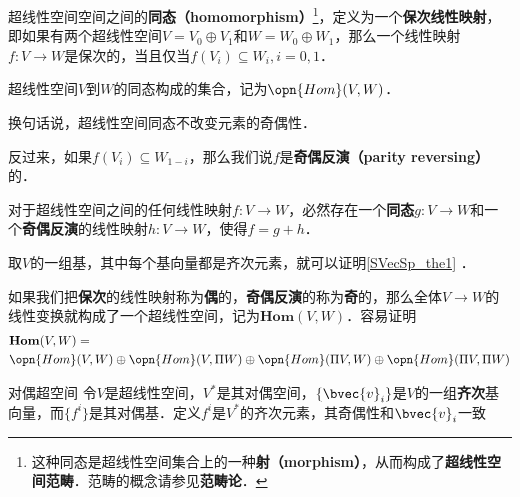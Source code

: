 超线性空间空间之间的\textbf{同态（homomorphism）}\footnote{这种同态是超线性空间集合上的一种\textbf{射（morphism）}，从而构成了\textbf{超线性空间范畴}．范畴的概念请参见\textbf{范畴论}．}，定义为一个\textbf{保次线性映射}，即如果有两个超线性空间$V=V_0\oplus V_1$和$W=W_0\oplus W_1$，那么一个线性映射$f:V\to W$是保次的，当且仅当$f(V_i)\subseteq W_i, i=0, 1$．

\begin{definition}{}
超线性空间$V$到$W$的同态构成的集合，记为$\opn{Hom}(V, W)$．
\end{definition}

换句话说，超线性空间同态不改变元素的奇偶性．

反过来，如果$f(V_i)\subseteq W_{1-i}$，那么我们说$f$是\textbf{奇偶反演（parity reversing）}的．

\begin{theorem}{}\label{SVecSp_the1}
对于超线性空间之间的任何线性映射$f:V\to W$，必然存在一个\textbf{同态}$g:V\to W$和一个\textbf{奇偶反演}的线性映射$h:V\to W$，使得$f=g+h$．
\end{theorem}

取$V$的一组基，其中每个基向量都是齐次元素，就可以证明\autoref{SVecSp_the1} ．

如果我们把\textbf{保次}的线性映射称为\textbf{偶}的，\textbf{奇偶反演}的称为\textbf{奇}的，那么全体$V\to W$的线性变换就构成了一个超线性空间，记为$\mathbf{Hom}(V, W)$．容易证明
\begin{equation}
\begin{aligned}
&\mathbf{Hom}(V, W)=\\&\opn{Hom}(V, W)\oplus\opn{Hom}(V, \Pi W)\oplus\opn{Hom}(\Pi V, W)\oplus\opn{Hom}(\Pi V, \Pi W)
\end{aligned}
\end{equation}

\begin{definition}{对偶超空间}
令$V$是超线性空间，$V^*$是其对偶空间，$\{\bvec{v}_i\}$是$V$的一组\textbf{齐次}基向量，而$\{f^i\}$是其对偶基．定义$f^i$是$V^*$的齐次元素，其奇偶性和$\bvec{v}_i$一致
\end{definition}






























